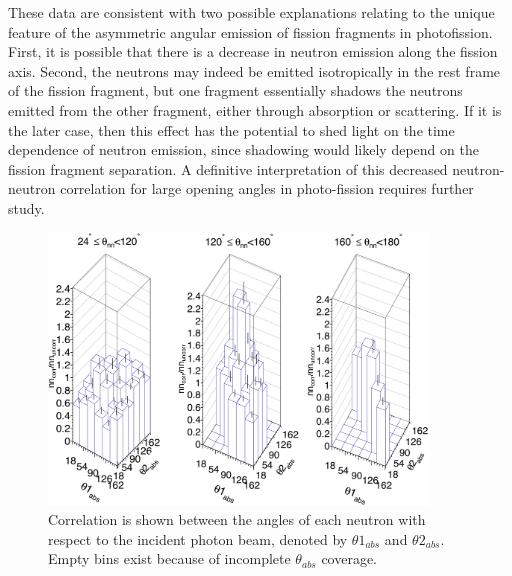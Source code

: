 These data are consistent with two possible explanations relating to the unique feature of the asymmetric angular emission of fission fragments in photofission.
First, it is possible that there is a decrease in neutron emission along the fission axis.
Second, the neutrons may indeed be emitted isotropically in the rest frame of the fission fragment, but one fragment essentially shadows the neutrons emitted from the other fragment, either through absorption or scattering.
If it is the later case, then this effect has the potential to shed light on the time dependence of neutron emission, since shadowing would likely depend on the fission fragment separation.
A definitive interpretation of this decreased neutron-neutron correlation for large opening angles in photo-fission requires further study.

\begin{figure}
\centering
    \includegraphics[width = 0.9\textwidth]{Content/Results/theta_abs_LEGO.png}
    \caption{Correlation is shown between the angles of each neutron with respect to the incident photon beam, denoted by $\theta 1_{abs}$ and $\theta 2_{abs}$.
    Empty bins exist because of incomplete $\theta_{abs}$ coverage.}
    \label{fig:theta_abs_LEGO}
\end{figure}
